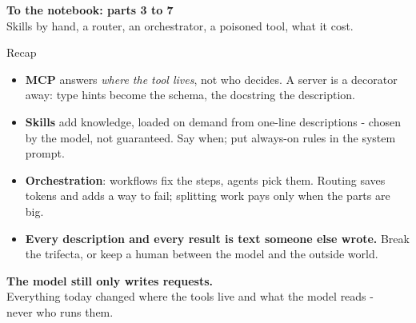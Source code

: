 \documentclass[aspectratio=169]{beamer}
\newcommand{\notebookframe}[2]{%
  \begin{frame}[plain]
    \vfill
    \begin{center}
      {\Large\bfseries\color{paramgreen} To the notebook: #1}\\[1.0em]
      {\large #2}
    \end{center}
    \vfill
  \end{frame}}
\begin{document}
\notebookframe{parts 3 to 7}{Skills by hand, a router, an orchestrator, a poisoned tool, what it cost.}

\begin{frame}{Recap}
  \vspace{0.4em}
  \small
  \begin{itemize}
    \item \textbf{MCP} answers \emph{where the tool lives}, not who decides. A server is a decorator away: type
      hints become the schema, the docstring the description.
    \item \textbf{Skills} add knowledge, loaded on demand from one-line descriptions - chosen by the model, not
      guaranteed. Say when; put always-on rules in the system prompt.
    \item \textbf{Orchestration}: workflows fix the steps, agents pick them. Routing saves tokens and adds a way
      to fail; splitting work pays only when the parts are big.
    \item \textbf{Every description and every result is text someone else wrote.} Break the trifecta, or keep a
      human between the model and the outside world.
  \end{itemize}
\end{frame}

\begin{frame}[plain]
  \vfill
  \begin{center}
    {\Large\bfseries\color{popblue} The model still only writes requests.}\\[0.8em]
    {\large Everything today changed where the tools live and what the model reads -}\\[0.25em]
    {\large never who runs them.}
  \end{center}
  \vfill
\end{frame}
\end{document}

